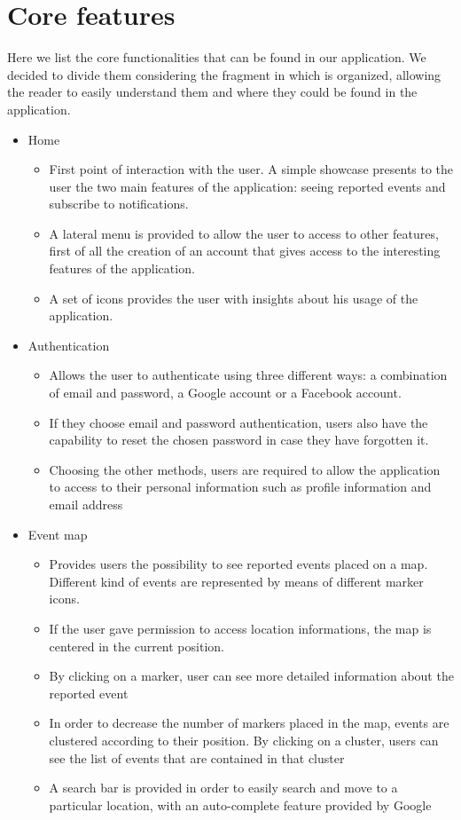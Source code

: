 \documentclass[a4paper]{scrreprt}
\begin{document}
\section{Core features}
Here we list the core functionalities that can be found in our application. We decided to divide them considering the fragment in which is organized, allowing the reader to easily understand them and where they could be found in the application.
\begin{itemize}
\item Home
\begin{itemize}
\item First point of interaction with the user. A simple showcase presents to the user the two main features of the application: seeing reported events and subscribe to notifications.
\item A lateral menu is provided to allow the user to access to other features, first of all the creation of an account that gives access to the interesting features of the application.
\item A set of icons provides the user with insights about his usage of the application.
\end{itemize}

\item Authentication
\begin{itemize}
\item Allows the user to authenticate using three different ways: a combination of email and password, a Google account or a Facebook account.
\item If they choose email and password authentication, users also have the capability to reset the chosen password in case they have forgotten it.
\item Choosing the other methods, users are required to allow the application to access to their personal information such as profile information and email address
\end{itemize}

\item Event map
\begin{itemize}
\item Provides users the possibility to see reported events placed on a map. Different kind of events are represented by means of different marker icons.
\item If the user gave permission to access location informations, the map is centered in the current position.
\item By clicking on a marker, user can see more detailed information about the reported event
\item In order to decrease the number of markers placed in the map, events are clustered according to their position. By clicking on a cluster, users can see the list of events that are contained in that cluster
\item A search bar is provided in order to easily search and move to a particular location, with an auto-complete feature provided by Google
\end{itemize}


\end{itemize}
\end{document}
